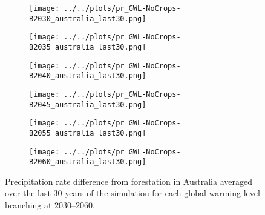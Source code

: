\documentclass[]{article}
\begin{document}
\begin{figure}[H]
    \centering
    \begin{subfigure}[b]{0.4\linewidth}
        \texttt{[image: ../../plots/pr\_GWL-NoCrops-B2030\_australia\_last30.png]}
    \end{subfigure}
    \begin{subfigure}[b]{0.4\linewidth}
        \texttt{[image: ../../plots/pr\_GWL-NoCrops-B2035\_australia\_last30.png]}
    \end{subfigure}
    \begin{subfigure}[b]{0.4\linewidth}
        \texttt{[image: ../../plots/pr\_GWL-NoCrops-B2040\_australia\_last30.png]}
    \end{subfigure}
    \begin{subfigure}[b]{0.4\linewidth}
        \texttt{[image: ../../plots/pr\_GWL-NoCrops-B2045\_australia\_last30.png]}
    \end{subfigure}
    \begin{subfigure}[b]{0.4\linewidth}
        \texttt{[image: ../../plots/pr\_GWL-NoCrops-B2055\_australia\_last30.png]}
    \end{subfigure}
    \begin{subfigure}[b]{0.4\linewidth}
        \texttt{[image: ../../plots/pr\_GWL-NoCrops-B2060\_australia\_last30.png]}
    \end{subfigure}
    \caption{Precipitation rate difference from forestation in Australia averaged over the last 30 years of the simulation for each global warming level branching at 2030–2060.}
    \label{fig:pr_australia}
\end{figure}
\end{document}
